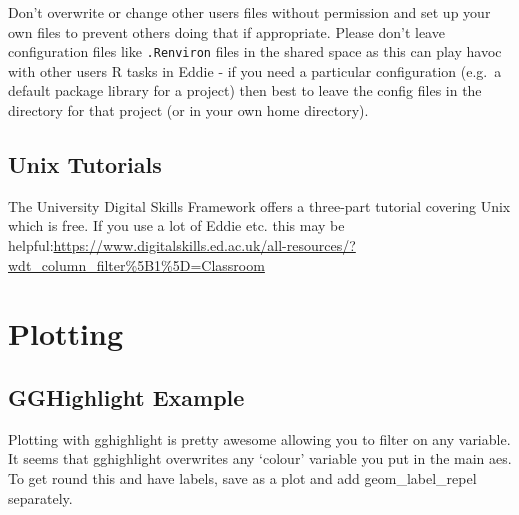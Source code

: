 \documentclass[]{book}
\begin{document}
Don't overwrite or change other users files without permission and set up your own files to prevent others doing that if appropriate. Please don't leave configuration files like \texttt{.Renviron} files in the shared space as this can play havoc with other users R tasks in Eddie - if you need a particular configuration (e.g.~a default package library for a project) then best to leave the config files in the directory for that project (or in your own home directory).

\hypertarget{unix-tutorials}{%
\section{Unix Tutorials}\label{unix-tutorials}}

The University Digital Skills Framework offers a three-part tutorial covering Unix which is free. If you use a lot of Eddie etc. this may be helpful:\url{https://www.digitalskills.ed.ac.uk/all-resources/?wdt_column_filter\%5B1\%5D=Classroom}

\hypertarget{plotting}{%
\chapter{Plotting}\label{plotting}}

\hypertarget{gghighlight-example}{%
\section{GGHighlight Example}\label{gghighlight-example}}

Plotting with gghighlight is pretty awesome allowing you to filter on any variable. It seems that gghighlight overwrites any `colour' variable you put in the main aes. To get round this and have labels, save as a plot and add geom\_label\_repel separately.
\end{document}

